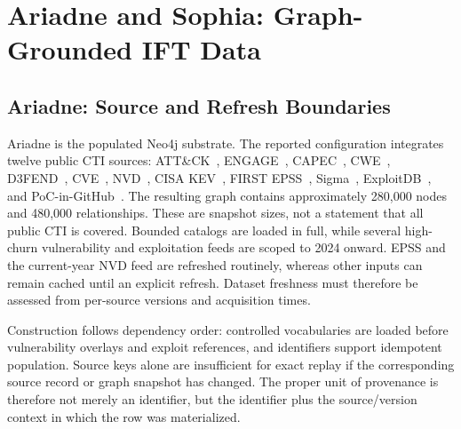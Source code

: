 \documentclass[conference]{IEEEtran}
\begin{document}
\section{Ariadne and Sophia: Graph-Grounded IFT Data}
\subsection{Ariadne: Source and Refresh Boundaries}
Ariadne is the populated Neo4j substrate. The reported configuration integrates twelve public CTI sources: ATT\&CK~\cite{strom2018attack}, ENGAGE~\cite{mitreengage}, CAPEC~\cite{capec}, CWE~\cite{cwe}, D3FEND~\cite{d3fend}, CVE~\cite{cve}, NVD~\cite{nvd}, CISA KEV~\cite{cisakev}, FIRST EPSS~\cite{jacobs2021epss}, Sigma~\cite{sigma}, ExploitDB~\cite{exploitdb}, and PoC-in-GitHub~\cite{pocingithub}. The resulting graph contains approximately 280,000 nodes and 480,000 relationships. These are snapshot sizes, not a statement that all public CTI is covered. Bounded catalogs are loaded in full, while several high-churn vulnerability and exploitation feeds are scoped to 2024 onward. EPSS and the current-year NVD feed are refreshed routinely, whereas other inputs can remain cached until an explicit refresh. Dataset freshness must therefore be assessed from per-source versions and acquisition times.

Construction follows dependency order: controlled vocabularies are loaded before vulnerability overlays and exploit references, and identifiers support idempotent population. Source keys alone are insufficient for exact replay if the corresponding source record or graph snapshot has changed. The proper unit of provenance is therefore not merely an identifier, but the identifier plus the source/version context in which the row was materialized.
\end{document}
